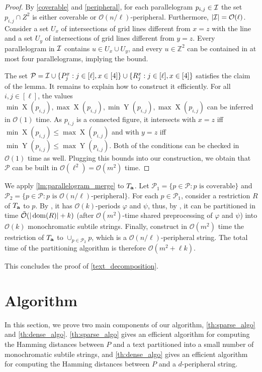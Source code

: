 \documentclass[11pt, letterpaper]{article}
\theoremstyle{plain}
\theoremstyle{definition}
\theoremstyle{remark}
\newcommand{\Z}{\mathbb{Z}}
\renewcommand{\O}{\mathcal{O}}
\newcommand{\tO}{\tilde{\mathcal{O}}}
\renewcommand{\phi}{\varphi}
\DeclareMathOperator*{\X}{X}
\DeclareMathOperator*{\Y}{Y}
\begin{document}
\begin{proof}
By \cref{coverable} and \cref{peripheral}, for each parallelogram $p_{i,j} \in \mathcal{I}$ the set $p_{i,j} \cap Z^2$ is either coverable or $\O(n/\ell)$-peripheral. Furthermore, $|\I| = \O(\ell)$. Consider a set $U_x$ of intersections of grid lines different from $x=z$ with the line and a set $U_y$ of intersections of grid lines different from $y=z$. Every parallelogram in $\mathcal{I}$ contains $u \in U_x \cup U_y$, and every $u \in \Z^2$ can be contained in at most four parallelograms, implying the bound. 

The set $\mathcal{P} = \mathcal{I} \cup \{P_j^x : j \in [\ell], x \in [4]\} \cup \{R_j^x : j \in [\ell], x \in [4]\}$ satisfies the claim of the lemma. It remains to explain how to construct it efficiently. For all $i,j \in [\ell]$, the values $\min \X(p_{i,j}), \max \X(p_{i,j}), \min \Y(p_{i,j}), \max \X(p_{i,j})$ can be inferred in $\O(1)$ time. As $p_{i,j}$ is a connected figure, it intersects with $x = z$ iff $\min \X(p_{i,j}) \le \max \X(p_{i,j})$ and with $y = z$ iff $\min \Y(p_{i,j}) \le \max \Y(p_{i,j})$. Both of the conditions can be checked in $\O(1)$ time as well. Plugging this bounds into our construction, we obtain that $\mathcal{P}$ can be built in $\O(\ell^2) = \O(m^2)$ time. 
\end{proof}

We apply \cref{lm:parallelogram_merge} to $T_\mathbf{a}$. Let $\mathcal{P}_1 = \{p \in \mathcal{P} : p \text { is coverable}\}$ and $\mathcal{P}_2 = \{p \in \mathcal{P} : p \text { is }\O(n/\ell)\text{-peripheral}\}$. For each $p \in \mathcal{P}_1$, consider a restriction $R$ of $T_\mathbf{a}$ to $p$. By , it has $\O(k)$-periods $\phi$ and $\psi$, thus, by , it can be partitioned in time $\tO(|\d{R}| + k)$ (after $\O(m^2)$-time shared preprocessing of $\phi$ and $\psi$) into $\O(k)$ monochromatic subtile strings. Finally, construct in $\O(m^2)$ time the restriction of $T_\mathbf{a}$ to $\cup_{p \in \mathcal{P_2}} p$, which is a $\O(n / \ell)$-peripheral string. The total time of the partitioning algorithm is therefore $\O(m^2+\ell k)$.

This concludes the proof of \cref{text_decomposition}.

\section{Algorithm}
\label{sec:algorithm}
In this section, we prove two main components of our algorithm, \cref{th:sparse_algo} and \cref{th:dense_algo}. \cref{th:sparse_algo} gives an efficient algorithm for computing the Hamming distances between $P$ and a text partitioned into a small number of monochromatic subtile strings, and \cref{th:dense_algo} gives an efficient algorithm for computing the Hamming distances between $P$ and a $d$-peripheral string.
\end{document}
